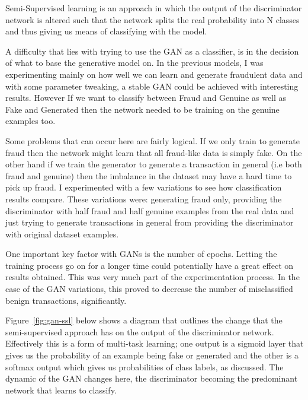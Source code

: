 \documentclass[12pt,a4paper,twoside]{report}
\begin{document}
Semi-Supervised learning\cite{odena2016semi} is an approach in which the output of the discriminator network is altered such that the network splits the real probability into N classes and thus giving us means of classifying with the model. 

A difficulty that lies with trying to use the GAN as a classifier, is in the decision of what to base the generative model on. In the previous models, I was experimenting mainly on how well we can learn and generate fraudulent data and with some parameter tweaking, a stable GAN could be achieved with interesting results. However If we want to classify between Fraud and Genuine as well as Fake and Generated then the network needed to be training on the genuine examples too. 

Some problems that can occur here are fairly logical. If we only train to generate fraud then the network might learn that all fraud-like data is simply fake. On the other hand if we train the generator to generate a transaction in general (i.e both fraud and genuine) then the imbalance in the dataset may have a hard time to pick up fraud. 
I experimented with a few variations to see how classification results compare. 
These variations were: generating fraud only, providing the discriminator with half fraud and half genuine examples from the real data and just trying to generate transactions in general from providing the discriminator with original dataset examples.

One important key factor with GANs is the number of epochs. Letting the training process go on for a longer time could potentially have a great effect on results obtained. This was very much part of the experimentation process. In the case of the GAN variations, this proved to decrease the number of misclassified benign transactions, significantly.

Figure~\ref{fig:gan-ssl} below shows a diagram that outlines the change that the semi-supervised approach has on the output of the discriminator network. Effectively this is a form of multi-task learning; one output is a sigmoid layer that gives us the probability of an example being fake or generated and the other is a softmax output which gives us probabilities of class labels, as discussed. The dynamic of the GAN changes here, the discriminator becoming the predominant network that learns to classify. 
\end{document}

